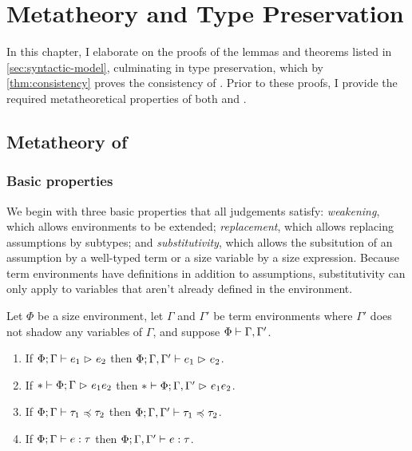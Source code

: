 \chapter{Metatheory and Type Preservation} \label{ch:proofs}

In this chapter, I elaborate on the proofs of the lemmas and theorems listed in \cref{sec:syntactic-model},
culminating in type preservation, which by \cref{thm:consistency} proves the consistency of \lang.
Prior to these proofs, I provide the required metatheoretical properties of both \lang and \CICE.

\section{Metatheory of \lang}

\subsection{Basic properties}

We begin with three basic properties that all judgements satisfy:
\emph{weakening}, which allows environments to be extended;
\emph{replacement}, which allows replacing assumptions by subtypes;
and \emph{substitutivity}, which allows the subsitution of an assumption by a well-typed term
or a size variable by a size expression.
Because term environments have definitions in addition to assumptions,
substitutivity can only apply to variables that aren't already defined in the environment.

\begin{lemma}[Weakening] \label{lem:weakening}
Let $\Phi$ be a size environment,
let $\Gamma$ and $\Gamma'$ be term environments
where $\Gamma'$ does not shadow any variables of $\Gamma$,
and suppose $\Phi \mathrel{\vdash} \Gamma, \Gamma'$.
\begin{enumerate}[noitemsep]
  \item \label{item:weakening:red} If $\Phi; \Gamma \mathrel{\vdash} e_1 \mathrel{\rhd}_{} e_2$ then $\Phi; \Gamma, \Gamma' \mathrel{\vdash} e_1 \mathrel{\rhd}_{} e_2$.
  \item \label{item:weakening:red*} If $* \mathrel{\vdash} \Phi; \Gamma \mathrel{\rhd}_{} e_1{e_2}$ then $* \mathrel{\vdash} \Phi; \Gamma, \Gamma' \mathrel{\rhd}_{} e_1{e_2}$.
  \item \label{item:weakening:subtype} If $\Phi; \Gamma \mathrel{\vdash} \tau_1 \mathrel{\preccurlyeq} \tau_2$ then $\Phi; \Gamma, \Gamma' \mathrel{\vdash} \tau_1 \mathrel{\preccurlyeq} \tau_2$.
  \item If $\Phi; \Gamma \mathrel{\vdash} e \mathrel{:} \tau$ then $\Phi; \Gamma, \Gamma' \mathrel{\vdash} e \mathrel{:} \tau$.
\end{enumerate}
\end{lemma}

